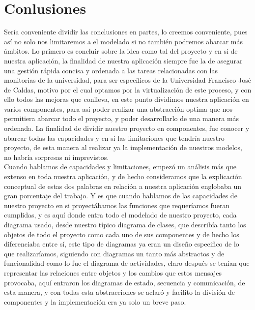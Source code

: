 \chapter{Conlusiones}
Sería conveniente dividir las conclusiones en partes, lo creemos conveniente, pues así no solo nos limitaremos a el modelado si no también podremos abarcar más ámbitos. 
\newline
\newline
Lo primero es concluir sobre la idea como tal del proyecto y en sí de nuestra aplicación, la finalidad de nuestra aplicación siempre fue la de asegurar una gestión rápida concisa y ordenada a las tareas relacionadas con las monitorias de la universidad, para ser específicos de la Universidad Francisco José de Caldas, motivo por el cual optamos por la virtualización de este proceso, y con ello todos las mejoras que conlleva, en este punto dividimos nuestra aplicación en varios componentes, para así poder realizar una abstracción optima que nos permitiera abarcar todo el proyecto, y poder desarrollarlo de una manera más ordenada. 
\newline
\newline
La finalidad de dividir nuestro proyecto en componentes, fue conocer y abarcar todas las capacidades y en si las limitaciones que tendría nuestro proyecto, de esta manera al realizar ya la implementación de nuestros modelos, no habría sorpresas ni imprevistos. 
\newline\\
\newline
Cuando hablamos de capacidades y limitaciones, empezó un análisis más que extenso en toda nuestra aplicación, y de hecho consideramos que la explicación conceptual de estas dos palabras en relación a nuestra aplicación englobaba un gran porcentaje del trabajo. Y es que cuando hablamos de las capacidades de nuestro proyecto en si proyectábamos las funciones que requeríamos fueran cumplidas, y es aquí donde entra todo el modelado de nuestro proyecto, cada diagrama usado, desde nuestro típico diagrama de clases, que describía tanto los objetos de todo el proyecto como cada uno de sus componentes y de hecho los diferenciaba entre sí, este tipo de diagramas ya eran un diseño especifico de lo que realizaríamos, siguiendo con diagramas un tanto más abstractos y de funcionalidad como lo fue el diagrama de actividades, claro después se tenían que representar las relaciones entre objetos y los cambios que estos mensajes provocaba, aquí entraron los diagramas de estado, secuencia y comunicación, de esta manera, y con todas esta abstracciones se aclaró y facilito la división de componentes y la implementación era ya solo un breve paso. 
